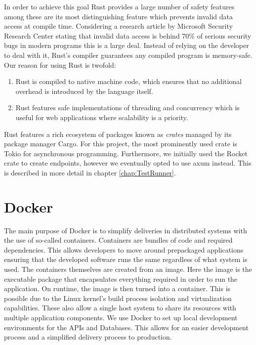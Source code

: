 In order to achieve this goal Rust provides a large number of safety features among these are its most distinguishing feature which prevents invalid data access at compile time. 
Considering a research article by Microsoft Security Research Center stating that invalid data access is behind 70\% of serious security bugs in modern programs this is a large deal\cite{Safe_Systems_Languages}. 
Instead of relying on the developer to deal with it, Rust's compiler guarantees any compiled program is memory-safe\cite{Rust_in_Action}.
Our reason for using Rust is twofold:
\begin{enumerate}
    \item Rust is compiled to native machine code, which ensures that no additional overhead is introduced by the language itself. 
    \item Rust features safe implementations of threading and concurrency which is useful for web applications where scalability is a priority.
\end{enumerate}
Rust features a rich ecosystem of packages known as \textit{crates} managed by its package manager Cargo\cite{Cargo}.
For this project, the most prominently used crate is Tokio\cite{Tokio} for asynchronous programming.
Furthermore, we initially used the Rocket\cite{Rocket} crate to create endpoints, however we eventually opted to use axum\cite{axum} instead.
This is described in more detail in chapter \ref{chap:TestRunner}. 

\section*{Docker}
The main purpose of Docker is to simplify deliveries in distributed systems with the use of so-called containers\cite{Docker_Container}.
Containers are bundles of code and required dependencies. This allows developers to move around prepackaged applications ensuring that the developed software runs the same regardless of what system is used\cite{Docker_Container}.
The containers themselves are created from an image. Here  the image is the executable package that encapsulates everything required in order to run the application. On runtime, the image is then turned into a container.
This is possible due to the Linux kernel's build process isolation and virtualization capabilities. These also allow a single host system to share its resources with multiple application components\cite{Docker_Container}.
We use Docker to set up local development environments for the APIs and Databases. This allows for an easier development process and a simplified delivery process to production.


